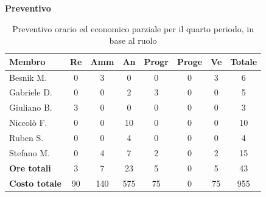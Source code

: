 \documentclass[a4paper,10pt]{article}
\begin{document}
\textbf{Preventivo} \\
\begin{table}[H]
  \centering
  \begin{tabular}{|l|c|c|c|c|c|c|c|}
    \hline
    \textbf{Membro} & \textbf{Re} & \textbf{Amm} & \textbf{An} & \textbf{Progr} & \textbf{Proge} & \textbf{Ve} & \textbf{Totale} \\
    \hline
    Besnik M.   & 0   & 3   & 0 & 0 & 0 & 3 & 6   \\
    Gabriele D. & 0   & 0   & 2   & 3 & 0 & 0 & 5 \\
    Giuliano B. & 3 & 0 & 0 & 0 & 0 & 0   & 3 \\
    Niccolò F.  & 0   & 0   & 10  & 0 & 0 & 0   & 10   \\
    Ruben S.    & 0   & 0 & 4   & 0 & 0 & 0   & 4  \\
    Stefano M.  & 0   & 4   & 7  & 2 & 0 & 2   & 15   \\
    \hline
    \textbf{Ore totali} & 3 & 7 & 23 & 5 & 0 & 5 & 43 \\
    \hline
    \textbf{Costo totale} & 90 & 140 & 575 & 75 & 0 & 75 & 955 \\
    \hline
  \end{tabular}
  \caption{Preventivo orario ed economico parziale per il quarto periodo, in base al ruolo}
\end{table}
\end{document}
